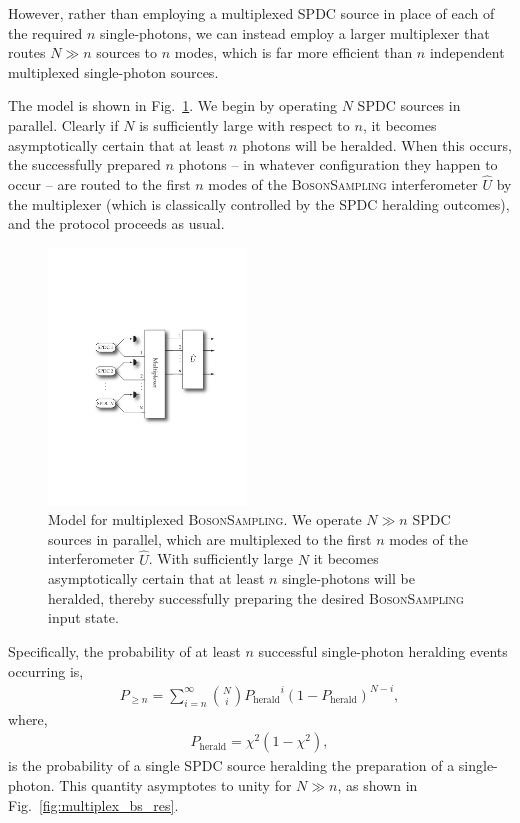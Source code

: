 However, rather than employing a multiplexed SPDC source in place of each of the required $n$ single-photons, we can instead employ a larger multiplexer that routes \mbox{$N\gg n$} sources to $n$ modes, which is far more efficient than $n$ independent multiplexed single-photon sources.

The model is shown in Fig.~\ref{fig:multiplexed_bs}. We begin by operating $N$ SPDC sources in parallel. Clearly if $N$ is sufficiently large with respect to $n$, it becomes asymptotically certain that at least $n$ photons will be heralded. When this occurs, the successfully prepared $n$ photons -- in whatever configuration they happen to occur -- are routed to the first $n$ modes of the \textsc{BosonSampling} interferometer $\hat{U}$ by the multiplexer (which is classically controlled by the SPDC heralding outcomes), and the protocol proceeds as usual.

\begin{figure}[!htb]
\includegraphics[width=0.47\textwidth]{multiplexed_boson_sampling}
\caption{Model for multiplexed \textsc{BosonSampling}. We operate \mbox{$N\gg n$} SPDC sources in parallel, which are multiplexed to the first $n$ modes of the interferometer $\hat{U}$. With sufficiently large $N$ it becomes asymptotically certain that at least $n$ single-photons will be heralded, thereby successfully preparing the desired \textsc{BosonSampling} input state.} \label{fig:multiplexed_bs}
\end{figure}

Specifically, the probability of at least $n$ successful single-photon heralding events occurring is,
\begin{align}
P_{\geq n} = \sum_{i=n}^\infty \binom{N}{i} 	{P_\text{herald}}^i (1-P_\text{herald})^{N-i},
\end{align}
where,
\begin{align}
	P_\text{herald} = \chi^2(1-\chi^2),
\end{align}
is the probability of a single SPDC source heralding the preparation of a single-photon. This quantity asymptotes to unity for \mbox{$N\gg n$}, as shown in Fig.~\ref{fig:multiplex_bs_res}.

